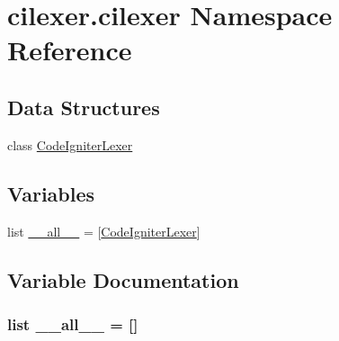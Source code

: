 \hypertarget{namespacecilexer_1_1cilexer}{}\section{cilexer.\+cilexer Namespace Reference}
\label{namespacecilexer_1_1cilexer}
\subsection*{Data Structures}
\begin{DoxyCompactItemize}
\item 
class \hyperlink{classcilexer_1_1cilexer_1_1_code_igniter_lexer}{Code\+Igniter\+Lexer}
\end{DoxyCompactItemize}
\subsection*{Variables}
\begin{DoxyCompactItemize}
\item 
list \hyperlink{namespacecilexer_1_1cilexer_aa4a022e6ddacd362b83964da5cc5d044}{\+\_\+\+\_\+all\+\_\+\+\_\+} = \mbox{[}\textquotesingle{}\hyperlink{classcilexer_1_1cilexer_1_1_code_igniter_lexer}{Code\+Igniter\+Lexer}\textquotesingle{}\mbox{]}
\end{DoxyCompactItemize}


\subsection{Variable Documentation}
\hypertarget{namespacecilexer_1_1cilexer_aa4a022e6ddacd362b83964da5cc5d044}{}
\subsubsection[{\+\_\+\+\_\+all\+\_\+\+\_\+}]{\setlength{\rightskip}{0pt plus 5cm}list \+\_\+\+\_\+all\+\_\+\+\_\+ = \mbox{[}\textquotesingle{}\mbox{]}}\label{namespacecilexer_1_1cilexer_aa4a022e6ddacd362b83964da5cc5d044}
